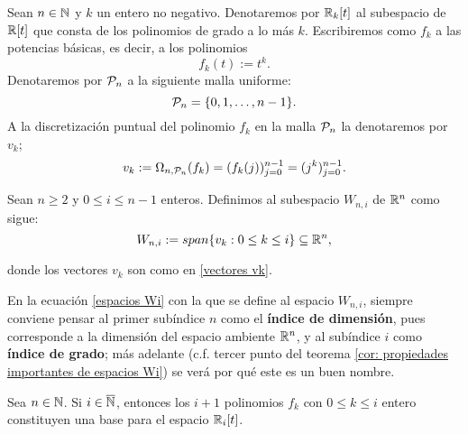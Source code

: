 \begin{notacion} \label{notacion: Pn, fk, Wi, vk}
Sean $n \in \mathbb{N}$ y $k$ un entero no negativo.
Denotaremos 
por $\mathbb{R}_{k}[t]$ al subespacio de $\mathbb{R}[t]$
que consta de los polinomios de grado a lo más $k$.
\noindent
Escribiremos como $f_{k}$ 
a las potencias básicas,
es decir, a los polinomios
\begin{equation}
\label{fk}
f_{k}(t):=t^{k}.
\end{equation}
Denotaremos por $\mathcal{P}_{n}$ a la siguiente
malla uniforme:
\begin{equation}
\label{malla Pn}
\mathcal{P}_{n}=\{ 0, 1, \ldots , n-1 \}.
\end{equation}
A la discretización puntual del
polinomio $f_{k}$ en la malla 
$\mathcal{P}_{n}$
la denotaremos por $v_{k}$;
\begin{equation}
\label{vectores vk}
v_{k}:= \Omega_{n, \mathcal{P}_{n}}(f_{k})
=(f_{k}(j))_{j=0}^{n-1}=(j^{k})_{j=0}^{n-1}.
\end{equation}
\end{notacion}

\begin{defi}
\label{def: espacis Wni}
Sean $n\geq 2$ y
$0 \leq i \leq n-1$ enteros.
Definimos al subespacio 
$W_{n,i}$ de $\mathbb{R}^{n}$ como sigue:
\begin{equation}
\label{espacios Wi}
W_{n,i} := span\{ v_{k} : 0 \leq k \leq i \} \subseteq \mathbb{R}^{n},
\end{equation}

\noindent
donde los vectores $v_{k}$ son como en \ref{vectores vk}.
\end{defi}


En la ecuación \eqref{espacios Wi} con la que se
define al espacio $W_{n,i}$,
siempre conviene pensar al primer subíndice $n$
como el \textbf{índice de dimensión}, pues corresponde
a la dimensión del espacio ambiente $\mathbb{R}^{n}$,
y al subíndice $i$ como \textbf{índice de grado};
más adelante (c.f. tercer punto del teorema 
\ref{cor: propiedades importantes de espacios Wi}) 
se verá por qué este es un buen nombre.



\begin{obs} \label{obs:independencia lineal polinomios}
Sea $n \in \mathbb{N}$. Si $i \in \overline{\mathbb{N}}$, entonces
los $i+1$ polinomios
$f_{k}$ con $0 \leq k \leq i$ entero
constituyen una base para el espacio $\mathbb{R}_{i}[t]$.
\end{obs}



